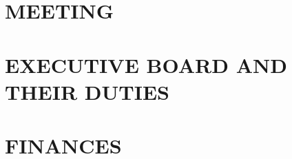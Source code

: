 \documentclass{article}
\begin{document}
\subsection{}
\section{MEETING}
\subsection{}
\subsection{}
\subsection{}
\subsection{}
\subsection{}
\subsection{}
\section{EXECUTIVE BOARD AND THEIR DUTIES}
\subsection{}
\section{FINANCES}
\subsection{}
\subsection{}
\subsection{}
\subsection{}
\end{document}
